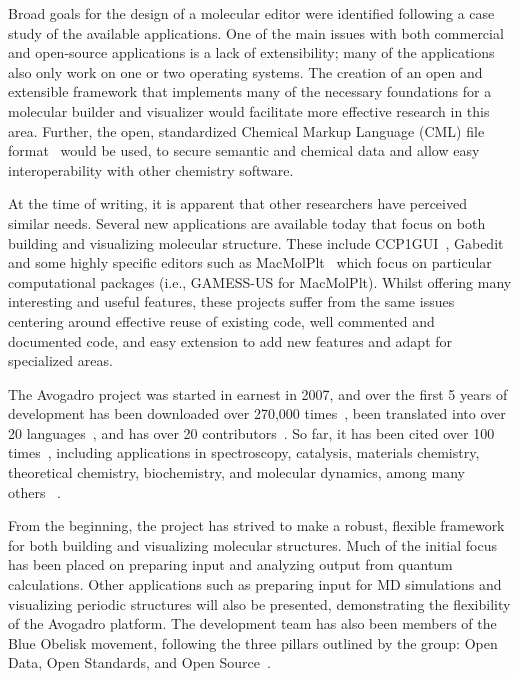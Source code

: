 \documentclass[10pt]{bmc_article}
\newenvironment{bmcformat}{\begin{raggedright}
  \baselineskip20pt\sloppy\setboolean{publ}{false}}{\end{raggedright}
  \baselineskip20pt\sloppy}
\begin{document}
\begin{bmcformat}
Broad goals for the design of a molecular editor were identified following a
case study of the available applications. One of the main issues with both
commercial and open-source applications is a lack of extensibility; many of the
applications also only work on one or two operating systems. The
creation of an open and extensible framework that implements many of the necessary foundations
for a molecular builder and visualizer would facilitate more effective research
in this area. Further, the open, standardized Chemical Markup Language
(CML) file format~\cite{CML2011a, CML2011b} would be used, to secure
semantic and chemical data and allow easy interoperability with other
chemistry software.

At the time of writing, it is apparent that other researchers have perceived
similar needs. Several new applications are available today that focus on both
building and visualizing molecular structure. These include
CCP1GUI~\cite{CCP1GUI}, Gabedit~\cite{Gabedit} and some highly specific
editors such as MacMolPlt~\cite{MacMolPlt} which focus on particular
computational packages (i.e., GAMESS-US for MacMolPlt). Whilst offering many
interesting and
useful features, these projects suffer from the same issues centering
around effective reuse of existing code, well commented and documented code, and
easy extension to add new features and adapt for specialized areas.

The Avogadro project was started in earnest in 2007, and over the
first 5 years of development has been downloaded over 270,000
times~\cite{Downloads}, been translated into over 20
languages~\cite{Translations}, and has over 20
contributors~\cite{OhlohContributors}. So far, it has been cited over
100 times~\cite{ScholarCitations}, including applications in spectroscopy,
catalysis, materials chemistry, theoretical chemistry, biochemistry, and
molecular dynamics, among many
others~\cite{MeraAdasme:2011hj,Closser:2010kc,Ide:2011cj,Menegazzo:2012by,
Patel:2011fe,Popov:2011gv,Hu:2011ce,Bingol:2012kx,Yao:2010id,Fleisher:2011vz,
Mayorkas:2011eu,Tian:2011ej,Kapla:2012ho,Mandal:2012ff,Bernstein:2010kc,
Hlawacek:2011gh,Forster:2012ka,Burkhardt:2010kc,Burkhardt:2011hn,Madison:2011kw}
.

From the beginning, the project
has strived to make a robust, flexible framework for
both building and visualizing molecular structures. Much of the initial focus
has been placed on preparing input and analyzing output from quantum
calculations. Other applications such as preparing input for MD simulations and
visualizing periodic structures will also be presented, demonstrating the
flexibility of the Avogadro platform. The development team has also been
members of the Blue Obelisk movement, following the three pillars outlined by
the group: Open Data, Open Standards, and Open Source~\cite{BlueObelisk2006,
BlueObelisk2011}.


\end{bmcformat}
\end{document}
